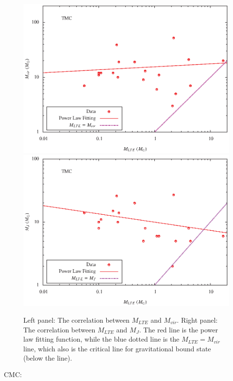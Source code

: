\documentclass{article}
\begin{document}
\begin{figure}[h]
\includegraphics[totalheight=40mm]{M_vir_tmc.eps}
\includegraphics[totalheight=40mm]{M_j_tmc.eps}

{Left panel: The correlation between $M_{LTE}$ and $M_{vir}$. Right panel: The correlation between $M_{LTE}$ and $M_{J}$. The red line is the power law fitting function, while the blue dotted line is the $M_{LTE}=M_{vir}$line, which also is the critical line for gravitational bound state (below the line).}
\end{figure}

\newpage

CMC:
\end{document}
